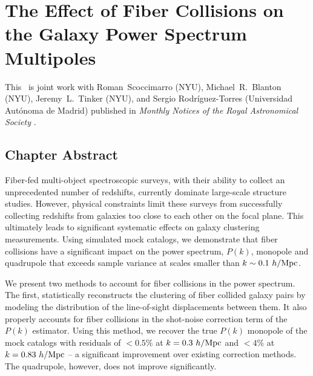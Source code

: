 \renewcommand{\chapid}{obvs}

\chapter{The Effect of Fiber Collisions on the Galaxy Power Spectrum Multipoles}

This \paper\ is joint work with Roman~Scoccimarro (NYU), 
Michael~R.~Blanton (NYU), Jeremy~L.~Tinker (NYU), and Sergio Rodr\'{i}guez-Torres 
(Universidad Aut\'{o}noma de Madrid) published in \emph{Monthly Notices of the Royal
Astronomical Society} \cite{Hahn:2017a}. 

\newcommand{\beqa}{\begin{eqnarray}}
\newcommand{\eeqa}{\end{eqnarray}}

\newcommand{\lexp}{\mathop{\langle}}
\newcommand{\rexp}{\mathop{\rangle}}
\newcommand{\rexpc}{\mathop{\rangle_c}}
\def\k{{\hbox{\BF k}}}
\def\x{{\hbox{\BF x}}}
\def\r{{\hbox{\BF r}}}
\def\s{{\hbox{\BF s}}}
\def\la{\mathrel{\mathpalette\fun <}}
\def\ga{\mathrel{\mathpalette\fun >}}
\def\fun#1#2{\lower3.6pt\vbox{\baselineskip0pt\lineskip.9pt
\ialign{$\mathsurround=0pt#1\hfill##\hfil$\crcr#2\crcr\sim\crcr}}}

\newcommand{\beq}{\begin{equation}}
\newcommand{\eeq}{\end{equation}}


\section{Chapter Abstract}
\qquad Fiber-fed multi-object spectroscopic surveys, with their ability to collect an unprecedented number of redshifts, currently dominate large-scale structure studies. However, physical constraints limit these surveys from successfully collecting redshifts from galaxies too close to each other on the focal plane. This ultimately leads to significant systematic effects on galaxy clustering measurements. Using simulated mock catalogs, we demonstrate that fiber collisions have a significant impact on the power spectrum, $P(k)$, monopole and quadrupole that exceeds sample variance at scales smaller than $k\sim0.1~h/{\rm Mpc}$.

\qquad We present two methods to account for fiber collisions in the power spectrum. The first, statistically reconstructs the clustering of fiber collided galaxy pairs by modeling the distribution of the line-of-sight displacements between them. It also properly accounts for fiber collisions in the shot-noise correction term of the $P(k)$ estimator. Using this method, we recover the true $P(k)$ monopole of the mock catalogs with residuals of $<0.5\%$ at $k=0.3~h/{\rm Mpc}$ and $<4\%$ at $k=0.83~h/{\rm Mpc}$ -- a significant improvement over existing correction methods. The quadrupole, however, does not improve significantly.

